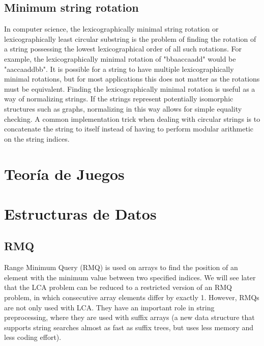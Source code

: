 \documentclass[10pt,letterpaper,twocolumn,twosided]{article}
\newcommand{\codigofuente}[1]{

\dotfill
}
\begin{document}
\codigofuente{src/string/suffix_array.cpp}

\subsection{Minimum string rotation}

In computer science, the lexicographically minimal string rotation or lexicographically least circular substring is the problem of finding the rotation of a string possessing the lowest lexicographical order of all such rotations. For example, the lexicographically minimal rotation of "bbaaccaadd" would be "aaccaaddbb". It is possible for a string to have multiple lexicographically minimal rotations, but for most applications this does not matter as the rotations must be equivalent. Finding the lexicographically minimal rotation is useful as a way of normalizing strings. If the strings represent potentially isomorphic structures such as graphs, normalizing in this way allows for simple equality checking. A common implementation trick when dealing with circular strings is to concatenate the string to itself instead of having to perform modular arithmetic on the string indices.

\codigofuente{src/string/minrot.cpp}

\section{Teoría de Juegos}

\section{Estructuras de Datos}

\subsection{RMQ}

Range Minimum Query (RMQ) is used on arrays to find the position of an element with the minimum value between two specified indices. We will see later that the LCA problem can be reduced to a restricted version of an RMQ problem, in which consecutive array elements differ by exactly 1.
However, RMQs are not only used with LCA. They have an important role in string preprocessing, where they are used with suffix arrays (a new data structure that supports string searches almost as fast as suffix trees, but uses less memory and less coding effort). 
\end{document}
